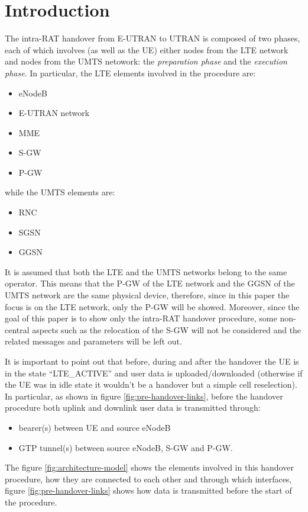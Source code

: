 \documentclass[12pt, a4paper]{article}
\begin{document}
\section{Introduction}
The intra-RAT handover from E-UTRAN to UTRAN is composed of two phases, each of
which involves (as well as the UE) either nodes from the LTE network and nodes
from the UMTS netowork: the \emph{preparation phase} and the \emph{execution phase}.
In particular, the LTE elements involved in the procedure are:
\begin{itemize}
  \item eNodeB
  \item E-UTRAN network
  \item MME
  \item S-GW
  \item P-GW
\end{itemize}
while the UMTS elements are:
\begin{itemize}
  \item RNC
  \item SGSN
  \item GGSN
\end{itemize}

It is assumed that both the LTE and the UMTS networks belong to the same
operator. This means that the P-GW of the LTE network and the GGSN of the UMTS
network are the same physical device, therefore, since in this paper the focus
is on the LTE network, only the P-GW will be showed. Moreover, since the goal
of this paper is to show only the intra-RAT handover procedure, some non-central
aspects such as the relocation of the S-GW will not be considered and the related
messages and parameters will be left out.

It is important to point out that before, during and after the handover the UE
is in the state ``LTE\_ACTIVE'' and user data is uploaded/downloaded (otherwise
if the UE was in idle state it wouldn't be a handover but a simple cell reselection).
In particular, as shown in figure \ref{fig:pre-handover-links}, before the handover procedure both uplink
and downlink user data is transmitted through:
\begin{itemize}
	\item bearer(s) between UE and source eNodeB
	\item GTP tunnel(s) between	source eNodeB, S-GW and P-GW.
\end{itemize}


The figure \ref{fig:architecture-model} shows the elements involved in this
handover procedure, how they are connected to each other and through which
interfaces, figure \ref{fig:pre-handover-links} shows how data is transmitted
before the start of the procedure.
\end{document}
